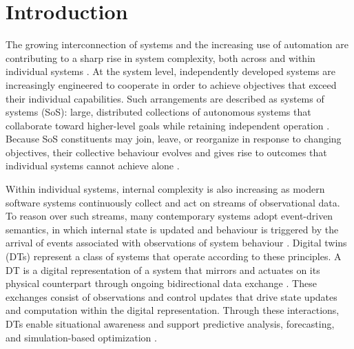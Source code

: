 
\chapter{Introduction}\label{ch:introduction}
The growing interconnection of systems and the increasing use of automation are contributing to a sharp rise in system complexity, both across and within individual systems \citep{incose2035}. At the system level, independently developed systems are increasingly engineered to cooperate in order to achieve objectives that exceed their individual capabilities. Such arrangements are described as systems of systems (SoS): large, distributed collections of autonomous systems that collaborate toward higher-level goals while retaining independent operation \citep{maier1998architecting}. Because SoS constituents may join, leave, or reorganize in response to changing objectives, their collective behaviour evolves and gives rise to outcomes that individual systems cannot achieve alone \citep{nielsen2015systems}.

Within individual systems, internal complexity is also increasing as modern software systems continuously collect and act on streams of observational data. To reason over such streams, many contemporary systems adopt event-driven semantics, in which internal state is updated and behaviour is triggered by the arrival of events associated with observations of system behaviour \citep{cugola2012processing}. Digital twins (DTs) represent a class of systems that operate according to these principles. A DT is a digital representation of a system that mirrors and actuates on its physical counterpart through ongoing bidirectional data exchange \citep{kritzinger2018digital}. These exchanges consist of observations and control updates that drive state updates and computation within the digital representation. Through these interactions, DTs enable situational awareness \citep{pires2019digital, zhang2024digital} and support predictive analysis, forecasting, and simulation-based optimization \citep{leng2021digital}.


